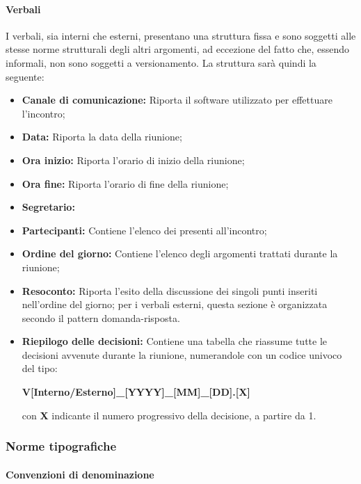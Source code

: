 \paragraph{Verbali}      

I verbali, sia interni che esterni, presentano una struttura fissa e sono soggetti alle stesse norme strutturali degli altri argomenti, ad eccezione del fatto che, essendo informali, non sono soggetti a versionamento.
La struttura sarà quindi la seguente:

\begin{itemize}

	\item \textbf{Canale di comunicazione:} Riporta il software utilizzato per effettuare l'incontro;
	\item \textbf{Data:} Riporta la data della riunione;
	\item \textbf{Ora inizio:} Riporta l'orario di inizio della riunione;
	\item \textbf{Ora fine:} Riporta l'orario di fine della riunione;
	\item \textbf{Segretario:} 
	\item \textbf{Partecipanti:} Contiene l'elenco dei presenti all'incontro;   
	\item \textbf{Ordine del giorno:} Contiene l'elenco degli argomenti trattati durante la riunione;
	\item \textbf{Resoconto:} Riporta l'esito della discussione dei singoli punti inseriti nell'ordine del giorno; per i verbali esterni, questa sezione è organizzata secondo il pattern domanda-risposta.
	\item \textbf{Riepilogo delle decisioni:}  Contiene una tabella che riassume tutte le decisioni avvenute durante la riunione, numerandole con un codice univoco del tipo: \newline 
	\centerline{\textbf{V[Interno/Esterno]\_[YYYY]\_[MM]\_[DD].[X]}}\newline con \textbf{X} indicante il numero progressivo della decisione, a partire da 1.

\end{itemize}


\subsubsection{Norme tipografiche}

\paragraph{Convenzioni di denominazione}   

